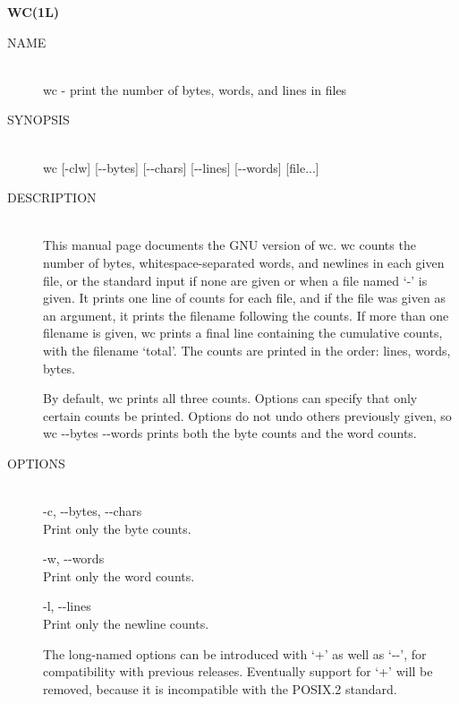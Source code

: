 
\begin{center} {\bf
WC(1L)
} \end{center}
\begin{description}


\item[NAME] \hfill \\
       wc - print the number of bytes, words, and lines in files

\item[SYNOPSIS] \hfill \\
       wc   [-clw]   [-\hspace{.01cm}-bytes]   [-\hspace{.01cm}-chars]   [-\hspace{.01cm}-lines]  [-\hspace{.01cm}-words]
       [file...]

\item[DESCRIPTION] \hfill \\
       This manual page documents the  GNU  version  of  wc.   wc
       counts  the  number  of bytes, whitespace-separated words,
       and newlines in each given file, or the standard input  if
       none  are  given  or  when  a file named `-' is given.  It
       prints one line of counts for each file, and if  the  file
       was given as an argument, it prints the filename following
       the counts.  If more than one filename is given, wc prints
       a  final  line  containing the cumulative counts, with the
       filename `total'.  The counts are printed  in  the  order:
       lines, words, bytes.

       By default, wc prints all three counts.  Options can specify 
       that only certain counts be printed.  Options  do  not
       undo others previously given, so wc -\hspace{.01cm}-bytes -\hspace{.01cm}-words prints
       both the byte counts and the word counts.

\item[OPTIONS] \hfill \\
       -c, -\hspace{.01cm}-bytes, -\hspace{.01cm}-chars \\
              Print only the byte counts.

       -w, -\hspace{.01cm}-words \\
              Print only the word counts.

       -l, -\hspace{.01cm}-lines \\
              Print only the newline counts.

       The long-named options can be introduced with `+' as  well
       as  `-\hspace{.01cm}-', for compatibility with previous releases.  Eventually 
       support for `+' will  be  removed,  because  it  is incompatible 
       with the POSIX.2 standard.
\end{description}

